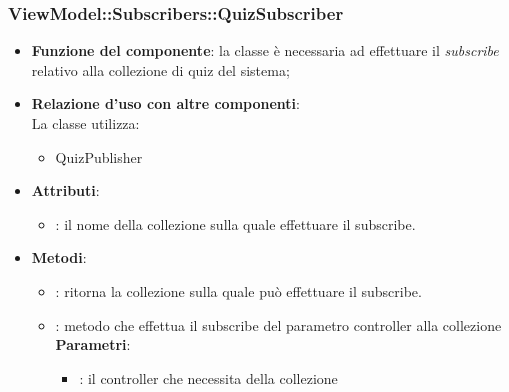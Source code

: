 \subsubsection{ViewModel::Subscribers::QuizSubscriber}
\begin{itemize}
\item\textbf{Funzione del componente}: la classe è necessaria ad effettuare il \emph{subscribe} relativo alla collezione di quiz del sistema;
	\item\textbf{Relazione d'uso con altre componenti}:\\
La classe utilizza:
	\begin{itemize}
		\item QuizPublisher
	\end{itemize}
\item\textbf{Attributi}:
	\begin{itemize}
		\item{}: il nome della collezione sulla quale effettuare il subscribe.\\	
	\end{itemize}
\item\textbf{Metodi}:
	\begin{itemize}
		\item{}: ritorna la collezione sulla quale può effettuare il subscribe.\\
		\item{}: metodo che effettua il subscribe del parametro controller alla collezione\\
		\textbf{Parametri}:
			\begin{itemize}
				\item{}: il controller che necessita della collezione\\
			\end{itemize}
	\end{itemize}
\end{itemize}

